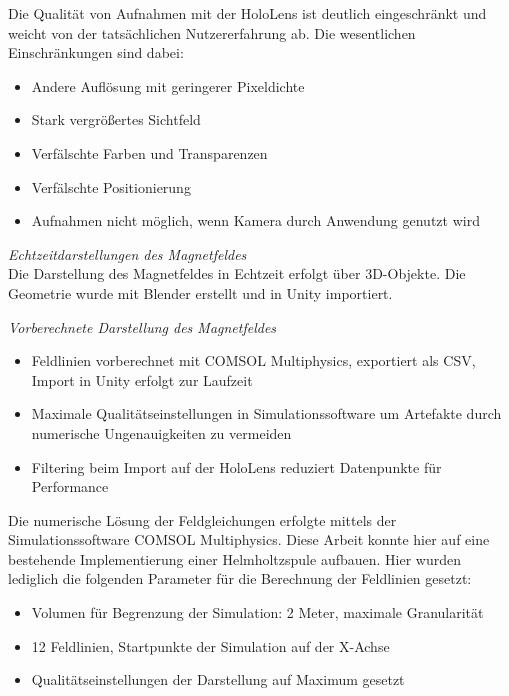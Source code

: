 Die Qualität von Aufnahmen mit der HoloLens ist deutlich eingeschränkt und weicht von der tatsächlichen Nutzererfahrung ab. Die wesentlichen Einschränkungen sind dabei: 
\begin{itemize}
	\setlength{\itemsep}{-1pt}
	\singlespacing
	\item Andere Auflösung mit geringerer Pixeldichte
	\item Stark vergrößertes Sichtfeld
	\item Verfälschte Farben und Transparenzen
	\item Verfälschte Positionierung
	\item Aufnahmen nicht möglich, wenn Kamera durch Anwendung genutzt wird
\end{itemize}

\textit{Echtzeitdarstellungen des Magnetfeldes}\\
Die Darstellung des Magnetfeldes in Echtzeit erfolgt über 3D-Objekte. Die Geometrie wurde mit Blender erstellt und in Unity importiert.

\textit{Vorberechnete Darstellung des Magnetfeldes}\\
\begin{itemize}[rightmargin=12px, topsep=-12px]
	\setlength{\itemsep}{-1pt}
	\singlespacing
	\item Feldlinien vorberechnet mit COMSOL Multiphysics, exportiert als CSV, Import in Unity erfolgt zur Laufzeit
	\item Maximale Qualitätseinstellungen in Simulationssoftware um Artefakte durch numerische Ungenauigkeiten zu vermeiden
	\item Filtering beim Import auf der HoloLens reduziert Datenpunkte für Performance
\end{itemize}

Die numerische Lösung der Feldgleichungen erfolgte mittels der Simulationssoftware COMSOL Multiphysics. Diese Arbeit konnte hier auf eine bestehende Implementierung einer Helmholtzspule aufbauen. Hier wurden lediglich die folgenden Parameter für die Berechnung der Feldlinien gesetzt:
\begin{itemize}
	\setlength{\itemsep}{-1pt}
	\singlespacing
	\item Volumen für Begrenzung der Simulation: 2 Meter, maximale Granularität
	\item 12 Feldlinien, Startpunkte der Simulation auf der X-Achse
	\item Qualitätseinstellungen der Darstellung auf Maximum gesetzt
\end{itemize}

